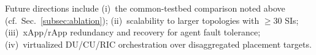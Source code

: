 \documentclass[12pt,lettersize,journal,onecolumn]{IEEEtran}
\begin{document}
Future directions include (i)~the common-testbed comparison noted above (cf.\ Sec.~\ref{subsec:ablation}); (ii)~scalability to larger topologies with $\ge30$ SIs; (iii)~xApp/rApp redundancy and recovery for agent fault tolerance; (iv)~virtualized DU/CU/RIC orchestration over disaggregated placement targets. %


\end{document}
